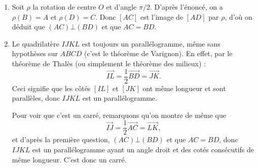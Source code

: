 \begin{exo}
\begin{sol}
\begin{enumerate}
\item Soit $\rho$ la rotation de centre $O$ et d'angle $\pi/2$. D'après l'énoncé, on a $\rho(B)=A$ et $\rho(D)=C$. Donc $[AC]$ est l'image de $[AD]$ par $\rho$, d'où on déduit que $(AC)\bot (BD)$ et que $AC=BD$.

\item Le quadrilatère $IJKL$ est toujours un parallélogramme, même sans hypothèses sur $ABCD$ (c'est le théorème de Varignon). En effet, par le théorème de Thalès (ou simplement le théorème des milieux) : 
\[ \overrightarrow{IL} = \frac12 \overrightarrow{BD} = \overrightarrow{JK}.\]
Ceci signifie que les côtés $[IL]$ et $[JK]$ ont même longueur et sont parallèles, donc $IJKL$ est un parallélogramme.

Pour voir que c'est un carré, remarquons qu'on montre de même que  
\[ \overrightarrow{IJ} = \frac12 \overrightarrow{AC} = \overrightarrow{LK},\]
et d'après la première question, $(AC)\bot (BD)$ et que $AC=BD$, donc $IJKL$ est un parallélogramme ayant un angle droit et des cotés consécutifs de même longueur. C'est donc un carré.
\end{enumerate}
\end{sol}
\end{exo}

